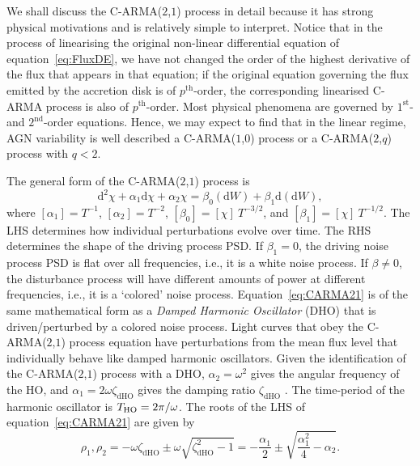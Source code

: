 \documentclass[a4paper,fleqn,usenatbib]{mnras}
\begin{document}
We shall discuss the C-ARMA($2$,$1$) process in detail because it has strong physical motivations and is relatively simple to interpret. Notice that in the process of linearising the original non-linear differential equation of equation~\eqref{eq:FluxDE}, we have not changed the order of the highest derivative of the flux that appears in that equation; if the original equation governing the flux emitted by the accretion disk is of $p^{\mathrm{th}}$-order, the corresponding linearised C-ARMA process is also of $p^{\mathrm{th}}$-order. Most physical phenomena are governed by $1^{\mathrm{st}}$- and  $2^{\mathrm{nd}}$-order equations. Hence, we may expect to find that in the linear regime, AGN variability is well described a C-ARMA($1$,$0$) process or a C-ARMA($2$,$q$) process with $q < 2$.

The general form of the C-ARMA($2$,$1$) process is
\begin{equation}\label{eq:CARMA21}
\mathrm{d}^{2}\chi + \alpha_{1} \mathrm{d}\chi + \alpha_{2} \chi = \beta_{0}(\mathrm{d}W) + \beta_{1} \mathrm{d}(\mathrm{d}W),
\end{equation}
where $[\alpha_{1}] = T^{-1}$, $[\alpha_{2}] = T^{-2}$, $[\beta_{0}] = [\chi]~T^{-3/2}$, and $[\beta_{1}] = [\chi]~T^{-1/2}$. The LHS determines how individual perturbations evolve over time. The RHS determines the shape of the driving process PSD. If $\beta_{1} = 0$, the driving noise process PSD is flat over all frequencies, i.e., it is a white noise process. If $\beta \neq 0$, the disturbance process will have different amounts of power at different frequencies, i.e., it is a `colored' noise process. Equation~\eqref{eq:CARMA21} is of the same mathematical form as a \textit{Damped Harmonic Oscillator} (DHO) that is driven/perturbed by a colored noise process. Light curves that obey the C-ARMA($2$,$1$) process equation have perturbations from the mean flux level that individually behave like damped harmonic oscillators.
Given the identification of the  C-ARMA($2$,$1$) process with a DHO, $\alpha_{2} = \omega^{2}$ gives the angular frequency of the HO, and $\alpha_{1} = 2\omega\zeta_{\mathrm{dHO}}$ gives the damping ratio $\zeta_{\mathrm{dHO}}$ \citep[see chapter~7 for notation]{PanditWu}. The time-period of the harmonic oscillator is $T_{\mathrm{HO}} = 2 \pi/\omega$. The roots of the LHS of equation~\eqref{eq:CARMA21} are given by
\begin{equation}\label{eq:CARMA21Roots}
\rho_{1},\rho_{2} = -\omega\zeta_{\mathrm{dHO}} \pm \omega \sqrt{\zeta_{\mathrm{dHO}}^{2} - 1} = -\frac{\alpha_{1}}{2} \pm \sqrt{\frac{\alpha_{1}^{2}}{4} - \alpha_{2}}.
\end{equation}
\end{document}
